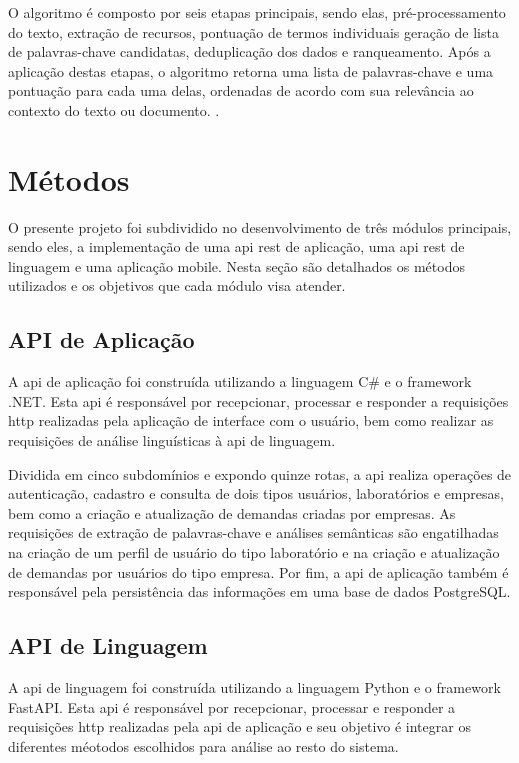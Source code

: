 O algoritmo é composto por seis etapas principais, sendo elas, pré-processamento do texto, extração de recursos, pontuação de termos individuais geração de lista de palavras-chave candidatas, deduplicação dos dados e ranqueamento. Após a aplicação destas etapas, o algoritmo retorna uma lista de palavras-chave e uma pontuação para cada uma delas, ordenadas de acordo com sua relevância ao contexto do texto ou documento. \cite{YakeKeywordExtractor}.

\section{Métodos}\label{sec:metodo}

O presente projeto foi subdividido no desenvolvimento de três módulos principais, sendo eles, a implementação de uma \gls{api} \gls{rest} de aplicação, uma \gls{api} \gls{rest} de linguagem e uma aplicação mobile. Nesta seção são detalhados os métodos utilizados e os objetivos que cada módulo visa atender.

\subsection{API de Aplicação}\label{subsec:app_api}

A \gls{api} de aplicação foi construída utilizando a linguagem C{\#} e o framework .NET. Esta \gls{api} é responsável por recepcionar, processar e responder a requisições \gls{http} realizadas pela aplicação de interface com o usuário, bem como realizar as requisições de análise linguísticas à \gls{api} de linguagem.

Dividida em cinco subdomínios e expondo quinze rotas, a \gls{api} realiza operações de autenticação, cadastro e consulta de dois tipos usuários, laboratórios e empresas, bem como a criação e atualização de demandas criadas por empresas. As requisições de extração de palavras-chave e análises semânticas são engatilhadas na criação de um perfil de usuário do tipo laboratório e na criação e atualização de demandas por usuários do tipo empresa. Por fim, a \gls{api} de aplicação também é responsável pela persistência das informações em uma base de dados PostgreSQL.

\subsection{API de Linguagem}\label{subsec:language_api}

A \gls{api} de linguagem foi construída utilizando a linguagem Python e o framework FastAPI. Esta \gls{api} é responsável por recepcionar, processar e responder a requisições \gls{http} realizadas pela \gls{api} de aplicação e seu objetivo é integrar os diferentes méotodos escolhidos para análise ao resto do sistema.

